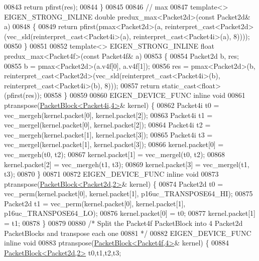 \begin{DoxyCode}
{00843   \textcolor{keywordflow}{return} pfirst(res);
00844 \}
00845 
00846 \textcolor{comment}{// max}
00847 \textcolor{keyword}{template}<> EIGEN\_STRONG\_INLINE \textcolor{keywordtype}{double} predux\_max<Packet2d>(\textcolor{keyword}{const} Packet2d& a)
00848 \{
00849   \textcolor{keywordflow}{return} pfirst(pmax<Packet2d>(a, reinterpret\_cast<Packet2d>(vec\_sld(reinterpret\_cast<Packet4i>(a), 
      reinterpret\_cast<Packet4i>(a), 8))));
00850 \}
00851 
00852 \textcolor{keyword}{template}<> EIGEN\_STRONG\_INLINE \textcolor{keywordtype}{float} predux\_max<Packet4f>(\textcolor{keyword}{const} Packet4f& a)
00853 \{
00854   Packet2d b, res;
00855   b   = pmax<Packet2d>(a.v4f[0], a.v4f[1]);
00856   res = pmax<Packet2d>(b, \textcolor{keyword}{reinterpret\_cast<}Packet2d\textcolor{keyword}{>}(vec\_sld(reinterpret\_cast<Packet4i>(b), 
      reinterpret\_cast<Packet4i>(b), 8)));
00857   \textcolor{keywordflow}{return} \textcolor{keyword}{static\_cast<}\textcolor{keywordtype}{float}\textcolor{keyword}{>}(pfirst(res));
00858 \}
00859 
00860 EIGEN\_DEVICE\_FUNC \textcolor{keyword}{inline} \textcolor{keywordtype}{void}
00861 ptranspose(\hyperlink{struct_eigen_1_1internal_1_1_packet_block}{PacketBlock<Packet4i,4>}& kernel) \{
00862   Packet4i t0 = vec\_mergeh(kernel.packet[0], kernel.packet[2]);
00863   Packet4i t1 = vec\_mergel(kernel.packet[0], kernel.packet[2]);
00864   Packet4i t2 = vec\_mergeh(kernel.packet[1], kernel.packet[3]);
00865   Packet4i t3 = vec\_mergel(kernel.packet[1], kernel.packet[3]);
00866   kernel.packet[0] = vec\_mergeh(t0, t2);
00867   kernel.packet[1] = vec\_mergel(t0, t2);
00868   kernel.packet[2] = vec\_mergeh(t1, t3);
00869   kernel.packet[3] = vec\_mergel(t1, t3);
00870 \}
00871 
00872 EIGEN\_DEVICE\_FUNC \textcolor{keyword}{inline} \textcolor{keywordtype}{void}
00873 ptranspose(\hyperlink{struct_eigen_1_1internal_1_1_packet_block}{PacketBlock<Packet2d,2>}& kernel) \{
00874   Packet2d t0 = vec\_perm(kernel.packet[0], kernel.packet[1], p16uc\_TRANSPOSE64\_HI);
00875   Packet2d t1 = vec\_perm(kernel.packet[0], kernel.packet[1], p16uc\_TRANSPOSE64\_LO);
00876   kernel.packet[0] = t0;
00877   kernel.packet[1] = t1;
00878 \}
00879 
00880 \textcolor{comment}{/* Split the Packet4f PacketBlock into 4 Packet2d PacketBlocks and transpose each one}
00881 \textcolor{comment}{ */}
00882 EIGEN\_DEVICE\_FUNC \textcolor{keyword}{inline} \textcolor{keywordtype}{void}
00883 ptranspose(\hyperlink{struct_eigen_1_1internal_1_1_packet_block}{PacketBlock<Packet4f,4>}& kernel) \{
00884   \hyperlink{struct_eigen_1_1internal_1_1_packet_block}{PacketBlock<Packet2d,2>} t0,t1,t2,t3;
}
\end{DoxyCode}
